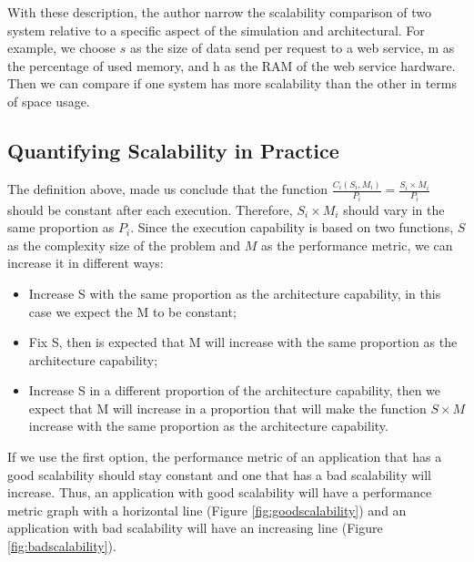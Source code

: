 With these description, the author narrow the scalability comparison of two system relative to a specific aspect of the simulation and architectural. For example, we choose $s$ as the size of data send per request to a web service, m as the percentage of used memory, and h as the RAM of the web service hardware. Then we can compare if one system has more scalability than the other in terms of space usage.

\subsection{Quantifying Scalability in Practice}

The definition above, made us conclude that the function $\frac{C_{i}(S_{i},M_{i})}{P_{i}} = \frac{S_{i} \times M_{i}}{P_{i}}$ should be constant after each execution. Therefore, $S_{i} \times M_{i}$ should vary in the same proportion as $P_{i}$. Since the execution capability is based on two functions, $S$ as the complexity size of the problem and $M$ as the performance metric, we can increase it in different ways:
\begin{itemize}
\item Increase S with the same proportion as the architecture capability, in this case we expect the M to be constant;
\item Fix S, then is expected that M will increase with the same proportion as the architecture capability;
\item Increase S in a different proportion of the architecture capability, then we expect that M will increase in a proportion that will make the function $S \times M$ increase with the same proportion as the architecture capability.
\end{itemize}

If we use the first option, the performance metric of an application that has a good scalability should stay constant and one that has a bad scalability will increase. Thus, an application with good scalability will have a performance metric graph with a horizontal line (Figure \ref{fig:goodscalability}) and an application with bad scalability will have an increasing line (Figure \ref{fig:badscalability}).


